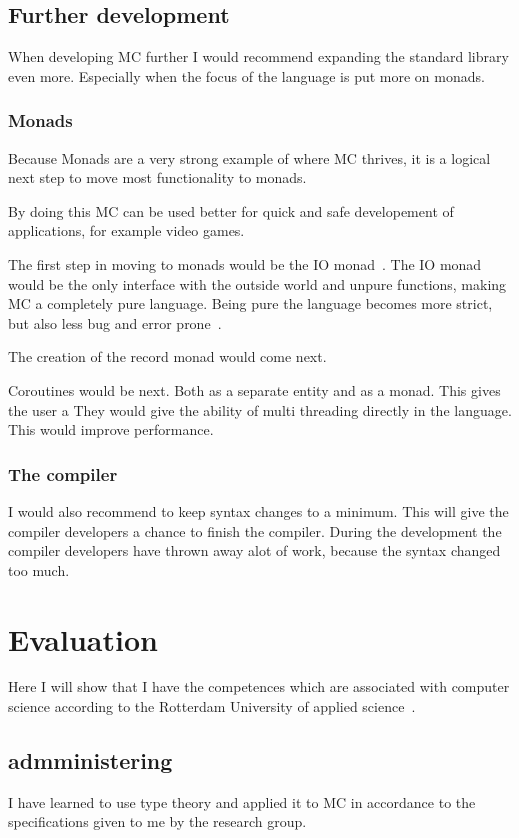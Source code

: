 \section{Further development}
When developing MC further I would recommend expanding the standard library even more.
Especially when the focus of the language is put more on monads.

\subsection{Monads}
Because Monads are a very strong example of where MC thrives, it is a logical next step to move most functionality to monads.

By doing this MC can be used better for quick and safe developement of applications, for example video games.

The first step in moving to monads would be the IO monad~\cite{iomonad}.
The IO monad would be the only interface with the outside world and unpure functions, making MC a completely pure language.
Being pure the language becomes more strict, but also less bug and error prone~\cite{purelanguage}.


The creation of the record monad would come next.

Coroutines would be next.
Both as a separate entity and as a monad.
This gives the user a
They would give the ability of multi threading directly in the language.
This would improve performance.


\subsection{The compiler}
I would also recommend to keep syntax changes to a minimum.
This will give the compiler developers a chance to finish the compiler.
During the development the compiler developers have thrown away alot of work, because the syntax changed too much.



\chapter{Evaluation}
Here I will show that I have the competences which are associated with computer science according to the Rotterdam University of applied science~\cite{citeershit}.

\section{admministering}
I have learned to use type theory and applied it to MC in accordance to the specifications given to me by the research group.

